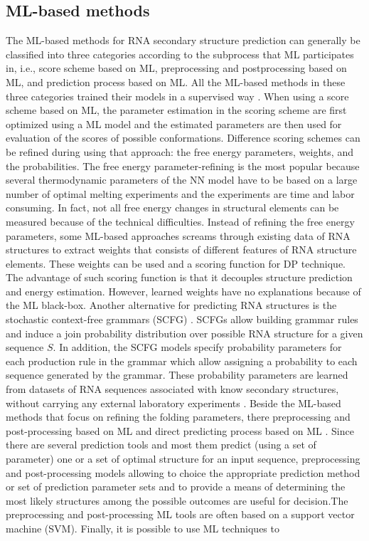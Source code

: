 \subsection{ML-based methods}
The ML-based methods for RNA secondary structure prediction can generally be classified into three categories according to the subprocess that ML participates in, i.e., score scheme based on ML, preprocessing and postprocessing based on ML, and prediction process based on ML. All the ML-based methods in these three categories trained their models in a supervised way \cite{zhao2021review}.  When using a score scheme based on ML,  the parameter estimation in the scoring scheme are first optimized using a ML model and the estimated parameters are then used for evaluation of the scores of possible conformations. Difference scoring schemes can be refined during using that approach: the free energy parameters, weights, and the probabilities. The free energy parameter-refining is the most popular because several thermodynamic parameters of the NN model have to be based on a large number of optimal melting experiments and the experiments are time and labor consuming. In fact, not all free energy changes in structural elements can be measured because of the technical difficulties. Instead of refining the free energy parameters, some ML-based approaches screams through existing data of RNA structures to extract weights that consists of different features of RNA structure elements. These weights can be used and a scoring function for DP technique. The advantage of such scoring function is that it decouples structure prediction and energy estimation. However, learned weights have no explanations because of the ML black-box. Another alternative for predicting RNA structures is the stochastic context-free grammars (SCFG) \cite{sakakibara1994stochastic, rivas2012range, dowell2004evaluation, knudsen1999rna, knudsen2003pfold, woodson2000recent}. SCFGs allow building grammar rules and induce a join probability distribution over possible RNA structure for a given sequence $S$. In addition, the SCFG models specify probability parameters for each production rule in the grammar which allow assigning a probability to each  sequence generated by the grammar.  These probability parameters are learned from datasets of RNA sequences associated with know secondary structures, without carrying any external laboratory experiments \cite{dowell2004evaluation}.  Beside the ML-based methods that focus on refining the folding parameters, there preprocessing and post-processing based on ML \cite{hor2013tool, zhu2018research,haynes2008using} and direct predicting process based on ML \cite{takefuji1990parallel,liu2006hopfield,steeg1993neural}. Since there are several prediction tools and most them predict (using a set of parameter) one or a set of optimal structure for an input sequence, preprocessing and post-processing models allowing to choice the appropriate prediction method or set of prediction parameter sets and to provide a means of determining the most likely structures among the possible outcomes are useful for decision.The preprocessing and post-processing ML tools are often based on a support vector machine (SVM).  Finally, it is possible to use ML techniques to 